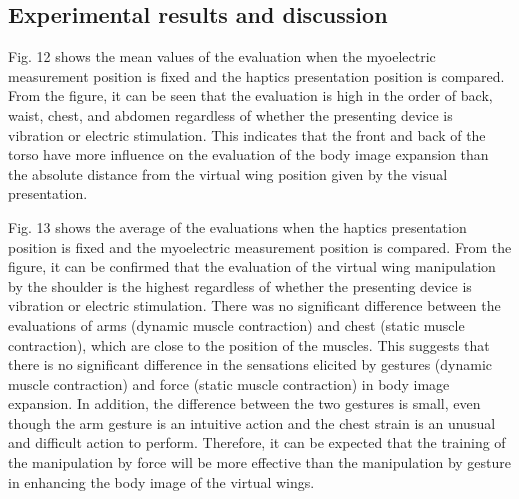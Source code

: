 \documentclass[letterpaper, 10 pt, conference]{ieeeconf}  %
\begin{document}
        \subsection{Experimental results and discussion}




                Fig. 12 shows the mean values of the evaluation when the myoelectric measurement position is fixed and the haptics presentation position is compared.
                From the figure, it can be seen that the evaluation is high in the order of back, waist, chest, and abdomen regardless of whether the presenting device is vibration or electric stimulation.
                This indicates that the front and back of the torso have more influence on the evaluation of the body image expansion than the absolute distance from the virtual wing position given by the visual presentation.

                Fig. 13 shows the average of the evaluations when the haptics presentation position is fixed and the myoelectric measurement position is compared.
                From the figure, it can be confirmed that the evaluation of the virtual wing manipulation by the shoulder is the highest regardless of whether the presenting device is vibration or electric stimulation. 
                There was no significant difference between the evaluations of arms (dynamic muscle contraction) and chest (static muscle contraction), which are close to the position of the muscles. 
                This suggests that there is no significant difference in the sensations elicited by gestures (dynamic muscle contraction) and force (static muscle contraction) in body image expansion. 
                In addition, the difference between the two gestures is small, even though the arm gesture is an intuitive action and the chest strain is an unusual and difficult action to perform. 
                Therefore, it can be expected that the training of the manipulation by force will be more effective than the manipulation by gesture in enhancing the body image of the virtual wings.
\end{document}
